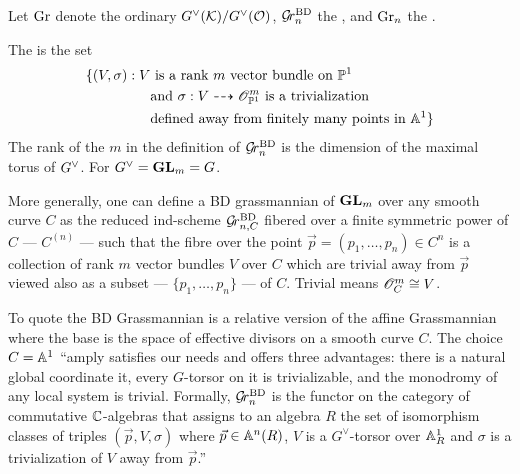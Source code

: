 \documentclass{article}
\newcommand{\anne}[2]{\colorbox{pink!75!blue}{#1}\marginpar[]{\tiny\textbf{\color{pink!50!blue}#2}}}
\begin{document}
Let $\Gr$ denote the ordinary  $\Gch(\cK)/\Gch(\cO)$, $\Grbd$ the , and $\Grc$ the . 

\begin{definition}
    The  is the set 
    \begin{equation}
        \label{eq:grbd}
    \begin{aligned}
        \{(V,\sigma) : V &\text{ is a rank } m \text{ vector bundle on }\PP^1 \\ &\text{and } \sigma: V \dashrightarrow \scO_{\PP^1}^m \text{ is a trivialization} \\
        &\text{defined away from finitely many points in }\AA^1\}
    \end{aligned}
    \end{equation}
    The rank of the $m$ in the definition of $\Grbd$ is the dimension of the maximal torus of $\Gch$. For $\Gch =\GL_m = G$. 

    More generally, one can define a BD grassmannian of $\GL_m$ over any smooth curve $C$ as the reduced ind-scheme $\Grbd[n,C]$ fibered over a finite symmetric power of $C$ --- $C^{(n)}$ --- such that the fibre over the point $\vec p = (p_1,\dots,p_n)\in C^n$ is a collection of rank $m$ vector bundles $V$ over $C$ which are trivial away from $\vec p$ viewed also as a subset --- $\{p_1,\dots,p_n\}$ --- of $C$. Trivial means $\scO_C^m\cong V$. 
\end{definition}


To quote \cite{baumann2020bases} the BD Grassmannian is a relative version of the affine Grassmannian where the base is the space of effective divisors on a smooth curve $C$. The choice $C = \AA^1$ ``amply satisfies our needs and offers three advantages: there is a natural global coordinate it, every \anne{$G$-torsor}{i.e. principal $G$ bundle?} on it is trivializable, and the monodromy of any local system is trivial. Formally, $\Grbd$ is the functor on the category of commutative $\CC$-algebras that assigns to an algebra $R$ the set of isomorphism classes of triples $(\vec p,V,\sigma)$ where $\vec p\in \AA^n(R)$, $V$ is a $G^\vee$-torsor over $\AA^1_R$ and $\sigma$ is a trivialization of $V$ away from $\vec p$.''
\end{document}
